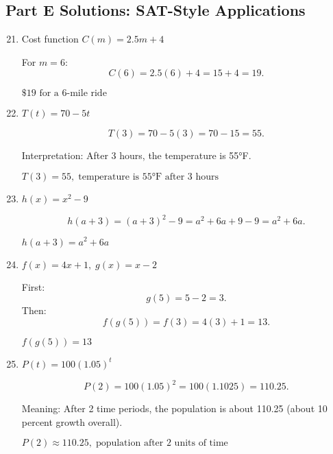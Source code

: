 \documentclass[12pt]{article}
\begin{document}
\subsection*{Part E Solutions: SAT-Style Applications}
\begin{enumerate}
  \setcounter{enumi}{20}
  \item Cost function \(C(m) = 2.5m + 4\)

  For \(m = 6\):
  \[
  C(6) = 2.5(6) + 4 = 15 + 4 = 19.
  \]

  \(\boxed{\$19 \text{ for a 6-mile ride}}\)

  \item \(T(t) = 70 - 5t\)

  \[
  T(3) = 70 - 5(3) = 70 - 15 = 55.
  \]

  Interpretation: After 3 hours, the temperature is 55°F.

  \(\boxed{T(3)=55,\; \text{temperature is 55°F after 3 hours}}\)

  \item \(h(x) = x^2 - 9\)

  \[
  h(a + 3) = (a + 3)^2 - 9 = a^2 + 6a + 9 - 9 = a^2 + 6a.
  \]

  \(\boxed{h(a + 3) = a^2 + 6a}\)

  \item \(f(x) = 4x + 1,\; g(x) = x - 2\)

  First:
  \[
  g(5) = 5 - 2 = 3.
  \]
  Then:
  \[
  f(g(5)) = f(3) = 4(3) + 1 = 13.
  \]

  \(\boxed{f(g(5)) = 13}\)

  \item \(P(t) = 100(1.05)^t\)

  \[
  P(2) = 100(1.05)^2 = 100(1.1025) = 110.25.
  \]

  Meaning: After 2 time periods, the population is about 110.25 (about 10 percent growth overall).

  \(\boxed{P(2) \approx 110.25,\; \text{population after 2 units of time}}\)
\end{enumerate}
\end{document}
